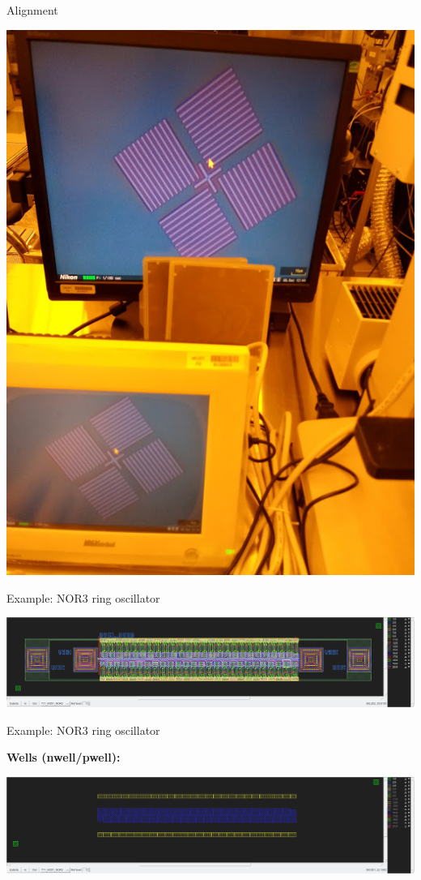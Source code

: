 \documentclass[aspectratio=169]{beamer}
\begin{document}
\begin{frame}{Alignment}
\begin{center}
\includegraphics[height=0.8\textheight]{images/20181211_161801_Burst01.jpg}
\end{center}
\end{frame}

\begin{frame}{Example: NOR3 ring oscillator}
\begin{center}
	\includegraphics[width=\textwidth]{images/Screenshot_20181219_184458.png}
\end{center}
\end{frame}

\begin{frame}{Example: NOR3 ring oscillator}
\begin{center}
	\textbf{Wells (nwell/pwell):}

	\includegraphics[width=\textwidth]{images/Screenshot_20181221_124540.png}
\end{center}
\end{frame}
\end{document}
